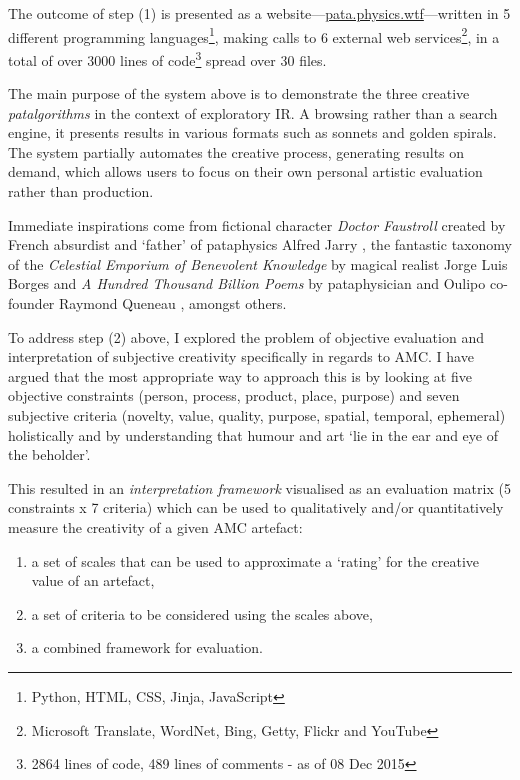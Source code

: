The outcome of step (1) is presented as a website---\url{pata.physics.wtf}---written in \num{5} different programming languages\footnote{Python, \acs{HTML}, \acs{CSS}, Jinja, JavaScript}, making calls to \num{6} external web services\footnote{Microsoft Translate, WordNet, Bing, Getty, Flickr and YouTube}, in a total of over \num{3000} lines of code\footnote{\num{2864} lines of code, \num{489} lines of comments - as of 08 Dec 2015} spread over \num{30} files.

The main purpose of the system above is to demonstrate the three creative \emph{patalgorithms} in the context of exploratory \acf{IR}. A browsing rather than a search engine, it presents results in various formats such as sonnets and golden spirals. The system partially automates the creative process, generating results on demand, which allows users to focus on their own personal artistic evaluation rather than production.

Immediate inspirations come from fictional character \textit{Doctor Faustroll} created by French absurdist and `father' of pataphysics Alfred Jarry \autocite*{Jarry1996}, the fantastic taxonomy of the \textit{Celestial Emporium of Benevolent Knowledge} by magical realist Jorge Luis Borges \autocite*{Borges2000} and \textit{A Hundred Thousand Billion Poems} by pataphysician and Oulipo co-founder Raymond Queneau \autocite*{Queneau1961}, amongst others.

To address step (2) above, I explored the problem of objective evaluation and interpretation of subjective creativity specifically in regards to \ac{AMC}. I have argued that the most appropriate way to approach this is by looking at five objective constraints (person, process, product, place, purpose) and seven subjective criteria (novelty, value, quality, purpose, spatial, temporal, ephemeral) holistically and by understanding that humour and art `lie in the ear and eye of the beholder'.

This resulted in an \emph{interpretation framework} visualised as an evaluation matrix (\num{5} constraints x \num{7} criteria) which can be used to qualitatively and/or quantitatively measure the creativity of a given \ac{AMC} artefact:

\begin{enumerate}
  \item a set of scales that can be used to approximate a `rating' for the creative value of an artefact,
  \item a set of criteria to be considered using the scales above,
  \item a combined framework for evaluation.
\end{enumerate}


